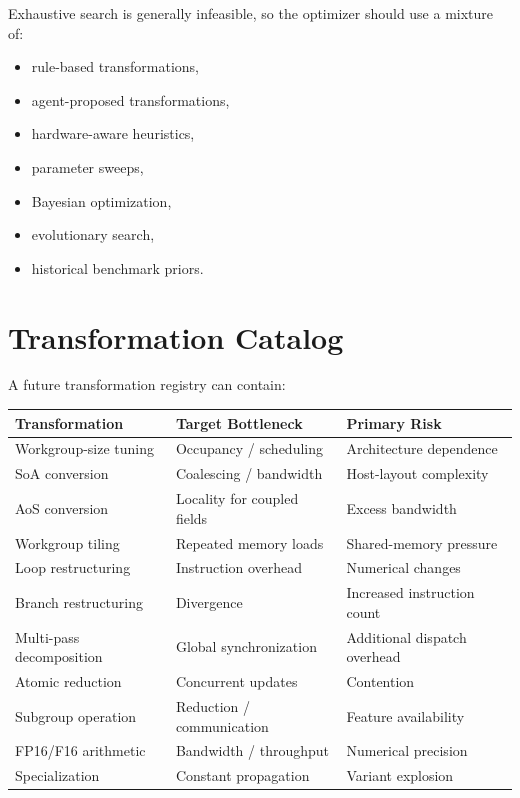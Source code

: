 \documentclass[11pt,a4paper,oneside]{report}
\begin{document}
Exhaustive search is generally infeasible, so the optimizer should use a mixture of:

\begin{itemize}
  \item rule-based transformations,
  \item agent-proposed transformations,
  \item hardware-aware heuristics,
  \item parameter sweeps,
  \item Bayesian optimization,
  \item evolutionary search,
  \item historical benchmark priors.
\end{itemize}

\section{Transformation Catalog}

A future transformation registry can contain:

\begin{longtable}{p{}p{}p{}}
\toprule
\textbf{Transformation} & \textbf{Target Bottleneck} & \textbf{Primary Risk}\\
\midrule
Workgroup-size tuning & Occupancy / scheduling & Architecture dependence\\
SoA conversion & Coalescing / bandwidth & Host-layout complexity\\
AoS conversion & Locality for coupled fields & Excess bandwidth\\
Workgroup tiling & Repeated memory loads & Shared-memory pressure\\
Loop restructuring & Instruction overhead & Numerical changes\\
Branch restructuring & Divergence & Increased instruction count\\
Multi-pass decomposition & Global synchronization & Additional dispatch overhead\\
Atomic reduction & Concurrent updates & Contention\\
Subgroup operation & Reduction / communication & Feature availability\\
FP16/F16 arithmetic & Bandwidth / throughput & Numerical precision\\
Specialization & Constant propagation & Variant explosion\\
\bottomrule
\end{longtable}
\end{document}
